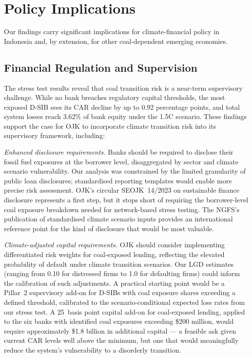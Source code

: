 
\section{Policy Implications}
\label{sec:discussion}


Our findings carry significant implications for climate-financial policy in Indonesia and, by extension, for other coal-dependent emerging economies.

\subsection{Financial Regulation and Supervision}

The stress test results reveal that coal transition risk is a near-term supervisory challenge. While no bank breaches regulatory capital thresholds, the most exposed D-SIB sees its CAR decline by up to 0.92 percentage points, and total system losses reach 3.62\% of bank equity under the 1.5\textdegree C scenario. These findings support the case for OJK to incorporate climate transition risk into its supervisory framework, including:

\textit{Enhanced disclosure requirements.} Banks should be required to disclose their fossil fuel exposures at the borrower level, disaggregated by sector and climate scenario vulnerability. Our analysis was constrained by the limited granularity of public loan disclosures; standardised reporting templates would enable more precise risk assessment. OJK's circular SEOJK~14/2023 on sustainable finance disclosure represents a first step, but it stops short of requiring the borrower-level coal exposure breakdown needed for network-based stress testing. The NGFS's publication of standardised climate scenario inputs \citep{NGFS2022} provides an international reference point for the kind of disclosure that would be most valuable.

\textit{Climate-adjusted capital requirements.} OJK should consider implementing differentiated risk weights for coal-exposed lending, reflecting the elevated probability of default under climate transition scenarios. Our LGD estimates (ranging from 0.10 for distressed firms to 1.0 for defaulting firms) could inform the calibration of such adjustments. A practical starting point would be a Pillar~2 supervisory add-on for D-SIBs with coal exposure shares exceeding a defined threshold, calibrated to the scenario-conditional expected loss rates from our stress test. A 25~basis point capital add-on for coal-exposed lending, applied to the six banks with identified coal exposures exceeding \$200 million, would require approximately \$1.8 billion in additional capital --- a feasible ask given current CAR levels well above the minimum, but one that would meaningfully reduce the system's vulnerability to a disorderly transition.

